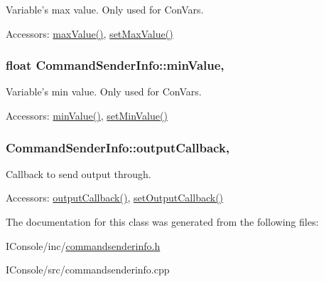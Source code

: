 Variable's max value. Only used for Con\-Vars. 

\begin{DoxyParagraph}{Accessors\-:}
\hyperlink{class_command_sender_info_ac5b816de5b4e61339e0b649bd8f58799}{max\-Value()}, \hyperlink{class_command_sender_info_af57f1c16ede28190022994e75206223f}{set\-Max\-Value()} 
\end{DoxyParagraph}
\hypertarget{class_command_sender_info_a7279460303b092c8d78735bd33e94ae0}{
\subsubsection[{min\-Value}]{\setlength{\rightskip}{0pt plus 5cm}float Command\-Sender\-Info\-::min\-Value\hspace{0.3cm}{\ttfamily [read]}, {\ttfamily [write]}}}\label{class_command_sender_info_a7279460303b092c8d78735bd33e94ae0}


Variable's min value. Only used for Con\-Vars. 

\begin{DoxyParagraph}{Accessors\-:}
\hyperlink{class_command_sender_info_a7279460303b092c8d78735bd33e94ae0}{min\-Value()}, \hyperlink{class_command_sender_info_ad1e49e6c18b5d75aacb8c7c68a79ed76}{set\-Min\-Value()} 
\end{DoxyParagraph}
\hypertarget{class_command_sender_info_af04b4cc7b75a48a4583411c1c130d654}{
\subsubsection[{output\-Callback}]{ Command\-Sender\-Info\-::output\-Callback\hspace{0.3cm}{\ttfamily [read]}, {\ttfamily [write]}}}\label{class_command_sender_info_af04b4cc7b75a48a4583411c1c130d654}


Callback to send output through. 

\begin{DoxyParagraph}{Accessors\-:}
\hyperlink{class_command_sender_info_af04b4cc7b75a48a4583411c1c130d654}{output\-Callback()}, \hyperlink{class_command_sender_info_a4cd8d7cbb6810d91565534616d3566c3}{set\-Output\-Callback()} 
\end{DoxyParagraph}


The documentation for this class was generated from the following files\-:\begin{DoxyCompactItemize}
\item 
I\-Console/inc/\hyperlink{commandsenderinfo_8h}{commandsenderinfo.\-h}\item 
I\-Console/src/commandsenderinfo.\-cpp\end{DoxyCompactItemize}
